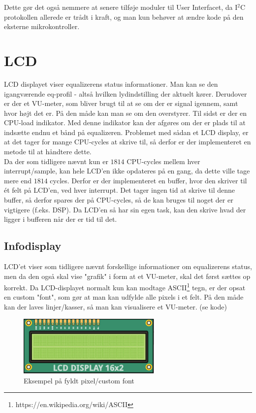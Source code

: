 Dette gør det også nemmere at senere tilføje moduler til User Interfacet, da I$^2$C protokollen allerede er trådt i kraft, og man kun behøver at ændre kode på den eksterne mikrokontroller.

\section{LCD}\label{sec:lcd}
LCD displayet viser equalizerens status informationer. Man kan se den igangværende eq-profil - altså hvilken lydindstilling der aktuelt kører. Derudover er der et VU-meter, som bliver brugt til at se om der er signal igennem, samt hvor højt det er. På den måde kan man se om den overstyrer. Til sidst er der en CPU-load indikator. Med denne indikator kan der afgøres om der er plads til at indsætte endnu et bånd på equalizeren. Problemet med sådan et LCD display, er at det tager for mange CPU-cycles at skrive til, så derfor er der implementeret en metode til at håndtere dette. \\

Da der som tidligere nævnt kun er $1814$ CPU-cycles mellem hver interrupt/sample, kan hele LCD'en ikke opdateres på en gang, da dette ville tage mere end $1814$ cycles. Derfor er der implementeret en buffer, hvor den skriver til ét felt på LCD'en, ved hver interrupt. Det tager ingen tid at skrive til denne buffer, så derfor spares der på CPU-cycles, så de kan bruges til noget der er vigtigere (f.eks. DSP). Da LCD'en så har sin egen task, kan den skrive hvad der ligger i bufferen når der er tid til det. \\

\subsection{Infodisplay}
LCD'et viser som tidligere nævnt forskellige informationer om equalizerens status, men da den også skal vise "grafik" i form at et VU-meter, skal det først sættes op korrekt. Da LCD-displayet normalt kun kan modtage ASCII\footnote{https://en.wikipedia.org/wiki/ASCII} tegn, er der opsat en custom "font", som gør at man kan udfylde alle pixels i et felt. På den måde kan der laves linjer/kasser, så man kan visualisere et VU-meter. (se kode)\\
 
\begin{figure}[h]
	\centering
	\includegraphics[width=7cm]{billeder/lcd_pixels}
	\caption{Eksempel på fyldt pixel/custom font}
\end{figure}

